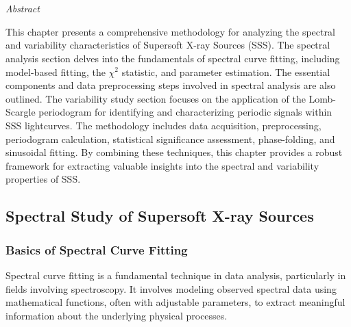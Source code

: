 \chapter{\MakeUppercase{\ChapterTitleTwo}} \label{chap:methodology}
    \minitoc
    
    \newpage
    \begin{center}
    	\emph{Abstract}
    \end{center}
    
    This chapter presents a comprehensive methodology for analyzing the spectral and variability characteristics of Supersoft X-ray Sources (SSS). The spectral analysis section delves into the fundamentals of spectral curve fitting, including model-based fitting, the $\chi^2$ statistic, and parameter estimation. The essential components and data preprocessing steps involved in spectral analysis are also outlined. The variability study section focuses on the application of the Lomb-Scargle periodogram for identifying and characterizing periodic signals within SSS lightcurves. The methodology includes data acquisition, preprocessing, periodogram calculation, statistical significance assessment, phase-folding, and sinusoidal fitting. By combining these techniques, this chapter provides a robust framework for extracting valuable insights into the spectral and variability properties of SSS.
    
    \newpage
    \section{Spectral Study of Supersoft X-ray Sources} \label{methodology:spectral}
    	
    	\subsection{Basics of Spectral Curve Fitting}
    		Spectral curve fitting is a fundamental technique in data analysis, particularly in fields involving spectroscopy. It involves modeling observed spectral data using mathematical functions, often with adjustable parameters, to extract meaningful information about the underlying physical processes.

